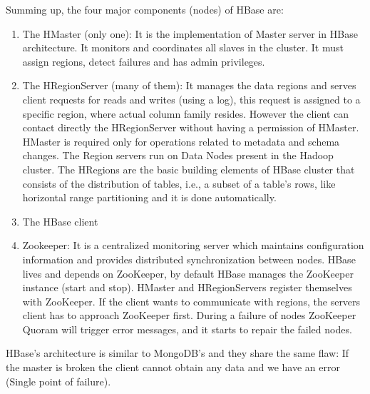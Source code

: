 \documentclass[a4page, 11pt]{article}
\begin{document}
Summing up, the four major components (nodes) of HBase are:
\begin{enumerate}[noitemsep]
	\item The HMaster (only one): It is the implementation of Master server in HBase architecture. It monitors and coordinates all slaves in the cluster. It must assign regions, detect failures and has admin privileges. 
	\item The HRegionServer (many of them): It manages the data regions and serves client requests for reads and writes (using a log), this request is assigned to a specific region, where actual column family resides. However the client can contact directly the HRegionServer without having a permission of HMaster. HMaster is required only for operations related to metadata and schema changes. The Region servers run on Data Nodes present in the Hadoop cluster.\newline
	The HRegions are the basic building elements of HBase cluster that consists of the distribution of tables, i.e., a subset of a table's rows, like horizontal range partitioning and it is done automatically.
	\item The HBase client
	\item Zookeeper: It is a centralized monitoring server which maintains configuration information and provides distributed synchronization between nodes.
	HBase lives and depends on ZooKeeper, by default HBase manages the ZooKeeper instance (start and stop). 
	HMaster and HRegionServers register themselves with ZooKeeper.
	If the client wants to communicate with regions, the servers client has to approach ZooKeeper first.
	During a failure of nodes ZooKeeper Quoram will trigger error messages, and it starts to repair the failed nodes.
\end{enumerate}
HBase's architecture is similar to MongoDB's and they share the same flaw: If the master is broken the client cannot obtain any data and we have an error (Single point of failure).
\end{document}
